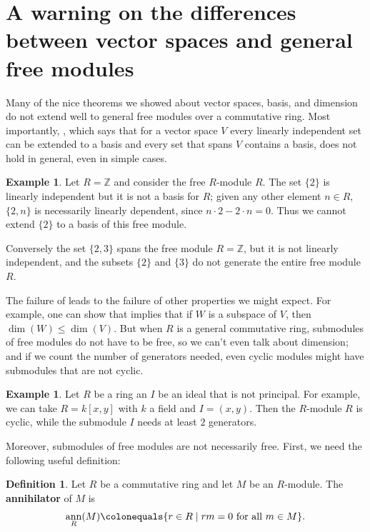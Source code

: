 \documentclass[12pt]{report}
\numberwithin{equation}{section}
\numberwithin{theorem}{chapter}
\theoremstyle{definition}
\newtheorem{definition}[theorem]{Definition}
\newtheorem{example}[theorem]{Example}
\newtheorem*{basic properties}{Basic Properties}
\newtheorem*{Important Remark}{Important Remark}
\newcommand{\df}[1]{{\bf #1}\index{#1}}
\newcommand{\Z}{\mathbb{Z}}
\DeclareMathOperator{\ann}{ann}
\begin{document}
\section{A warning on the differences between vector spaces and general free modules}

Many of the nice theorems we showed about vector spaces, basis, and dimension do not extend well to general free modules over a commutative ring. Most importantly, , which says that for a vector space $V$ every linearly independent set can be extended to a basis and every set that spans $V$ contains a basis, does not hold in general, even in simple cases.

\begin{example}
	Let $R = \Z$ and consider the free $R$-module $R$. The set $\{ 2 \}$ is linearly independent but it is not a basis for $R$; given any other element $n \in R$, $\{ 2, n \}$ is necessarily linearly dependent, since $n \cdot 2 - 2 \cdot n = 0$. Thus we cannot extend $\{ 2 \}$ to a basis of this free module.
	
	Conversely the set $\{2, 3 \}$ spans the free module $R = \Z$, but it is not linearly independent, and the subsets $\{ 2 \}$ and $\{ 3 \}$ do not generate the entire free module $R$.
\end{example}


The failure of  leads to the failure of other properties we might expect. For example, one can show that  implies that if $W$ is a subspace of $V$, then $\dim(W) \leqslant \dim(V)$. But when $R$ is a general commutative ring, submodules of free modules do not have to be free, so we can't even talk about dimension; and if we count the number of generators needed, even cyclic modules might have submodules that are not cyclic.

\begin{example}
	Let $R$ be a ring an $I$ be an ideal that is not principal. For example, we can take $R = k[x,y]$ with $k$ a field and $I = (x,y)$. Then the $R$-module $R$ is cyclic, while the submodule $I$ needs at least $2$ generators.
\end{example}

Moreover, submodules of free modules are not necessarily free. First, we need the following useful definition:

\begin{definition}
	Let $R$ be a commutative ring and let $M$ be an $R$-module. The \df{annihilator} of $M$ is
	$$\ann_R(M) \colonequals \{ r \in R \mid rm = 0 \text{ for all } m \in M \}.$$
\end{definition}
\end{document}
